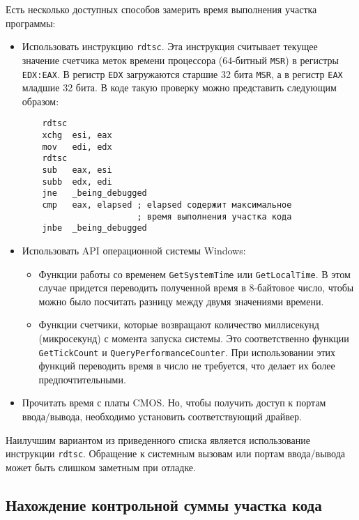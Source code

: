 Есть несколько доступных способов замерить время выполнения участка программы:
\begin{itemize}
  \item Использовать инструкцию \verb!rdtsc!. Эта инструкция считывает текущее
    значение счетчика меток времени процессора (64-битный \verb!MSR!) в регистры
    \verb!EDX:EAX!. В регистр \verb!EDX! загружаются старшие 32 бита \verb!MSR!,
    а в регистр \verb!EAX! младшие 32 бита. В коде такую проверку можно
    представить следующим образом:
    \begin{verbatim}
    rdtsc
    xchg  esi, eax
    mov   edi, edx
    rdtsc
    sub   eax, esi
    subb  edx, edi
    jne   _being_debugged
    cmp   eax, elapsed ; elapsed содержит максимальное
                       ; время выполнения участка кода
    jnbe  _being_debugged
    \end{verbatim}

  \item Использовать API операционной системы Windows:
    \begin{itemize}[labelindent=2\parindent, leftmargin=\parindent]
      \item Функции работы со временем \verb!GetSystemTime! или
        \verb!GetLocalTime!. В этом случае придется переводить полученной время
        в 8-байтовое число, чтобы можно было посчитать разницу между двумя
        значениями времени.
      \item Функции счетчики, которые возвращают количество миллисекунд
        (микросекунд) с момента запуска системы. Это соответственно функции
        \verb!GetTickCount! и \verb!QueryPerformanceCounter!. При использовании
        этих функций переводить время в число не требуется, что делает их более
        предпочтительными.
    \end{itemize}

  \item Прочитать время с платы CMOS. Но, чтобы получить доступ к портам
    ввода/вывода, необходимо установить соответствующий драйвер.
\end{itemize}

Наилучшим вариантом из приведенного списка является использование инструкции
\verb!rdtsc!. Обращение к системным вызовам или портам ввода/вывода может быть
слишком заметным при отладке.

\subsection{Нахождение контрольной суммы участка кода}

